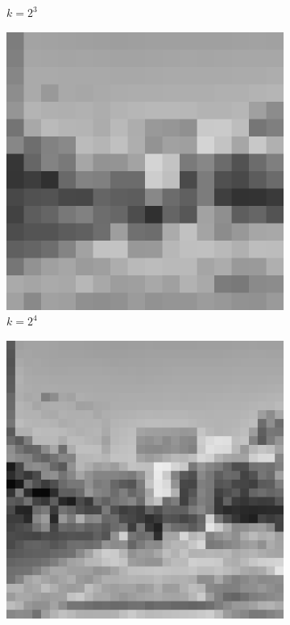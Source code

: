 \begin{figure}[H]
\begin{subfigure}[b]{0.3\textwidth}
        \caption{$k = 2^3$}
    \end{subfigure}
    \hfill
    \begin{subfigure}[b]{0.3\textwidth}
        \centering
        \includegraphics[width=\textwidth]{problem2/high_freq_16.bmp}
        \caption{$k = 2^4$}
    \end{subfigure}
    \hfill
    \begin{subfigure}[b]{0.3\textwidth}
        \centering
        \includegraphics[width=\textwidth]{problem2/high_freq_32.bmp}

\end{subfigure}
\end{figure}
